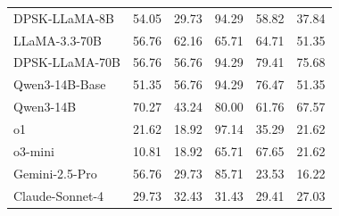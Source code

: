\documentclass[11pt]{article}
\begin{document}
\begin{table}[htbp]
{\begin{tabular}{lccccc}
    DPSK-LLaMA-8B & 54.05 & 29.73 & 94.29 & 58.82 & 37.84 \\
    LLaMA-3.3-70B & 56.76 & 62.16 & 65.71 & 64.71 & 51.35 \\
    DPSK-LLaMA-70B & 56.76 & 56.76 & 94.29 & 79.41 & 75.68 \\
    Qwen3-14B-Base & 51.35 & 56.76 & 94.29 & 76.47 & 51.35 \\
    Qwen3-14B & 70.27 & 43.24 & 80.00 & 61.76 & 67.57 \\
    o1 & 21.62 & 18.92 & 97.14 & 35.29 & 21.62 \\
    o3-mini & 10.81 & 18.92 & 65.71 & 67.65 & 21.62 \\
    Gemini-2.5-Pro & 56.76 & 29.73 & 85.71 & 23.53 & 16.22 \\
    Claude-Sonnet-4 & 29.73 & 32.43 & 31.43 & 29.41 & 27.03 \\
    \bottomrule
  \end{tabular}
}
\end{table}
\end{document}
